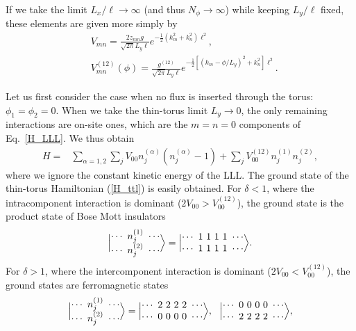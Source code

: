 \documentclass[aps,prb,twocolumn,superscriptaddress,showpacs,floatfix]{revtex4-1}
\begin{document}
If we take the limit $L_x/\ell\to\infty$ (and thus $N_\phi\to\infty$) while keeping $L_y/\ell$ fixed, these elements are given more simply by 
\begin{subequations}\label{Vmn_simple}
\begin{align}
&V_{mn}=\frac{2z_{mn}g}{\sqrt{2\pi} L_y\ell} e^{-\frac12 (k_m^2+k_n^2)\ell^2}, \\
&V_{mn}^{(12)}(\phi)=\frac{g^{(12)}}{\sqrt{2\pi} L_y\ell} e^{-\frac12 [(k_m-\phi/L_y)^2+k_n^2]\ell^2}.
\end{align}
\end{subequations}

Let us first consider the case when no flux is inserted through the torus: $\phi_1=\phi_2=0$. When we take the thin-torus limit $L_y\to 0$, the only remaining interactions are on-site ones, which are the $m=n=0$ components of Eq.\ \eqref{H_LLL}. We thus obtain
\begin{align}
H=&\sum_{\alpha=1,2}\sum_j V_{00}n^{(\alpha)}_j(n^{(\alpha)}_j-1)
+\sum_j V^{(12)}_{00}n^{(1)}_j n^{(2)}_{j},\label{H_ttl}
\end{align}
where we ignore the constant kinetic energy of the LLL. 
The ground state of the thin-torus Hamiltonian (\ref{H_ttl}) is easily obtained. For $\delta<1$, where the intracomponent interaction is dominant ($2V_{00}>V^{(12)}_{00}$), the ground state is the product state of Bose Mott insulators
\begin{equation}
\Bigl|\begin{matrix}
\cdots\ n_j^{(1)}\ \cdots\\
\cdots\ n_j^{(2)}\ \cdots
\end{matrix}
\Bigr\rangle=
\Bigl|\begin{matrix}
\cdots\ 1\ 1\ 1\ 1\ \cdots\\
\cdots\ 1\ 1\ 1\ 1\ \cdots
\end{matrix}\Bigr\rangle. 
\label{Mott}
\end{equation}
For $\delta>1$, where the intercomponent interaction is dominant ($2V_{00}<V^{(12)}_{00}$), the ground states are ferromagnetic states
\begin{equation}
\Bigl|\begin{matrix}
\cdots\ n_j^{(1)}\ \cdots\\
\cdots\ n_j^{(2)}\ \cdots
\end{matrix}
\Bigr\rangle=
\Bigl|\begin{matrix}
\cdots\ 2\ 2\ 2\ 2\ \cdots\\
\cdots\ 0\ 0\ 0\ 0\ \cdots
\end{matrix}\Bigr\rangle
,~~
\Bigl|\begin{matrix}
\cdots\ 0\ 0\ 0\ 0\ \cdots\\
\cdots\ 2\ 2\ 2\ 2\ \cdots
\end{matrix}\Bigr\rangle,
\label{FM}
\end{equation}
\end{document}
